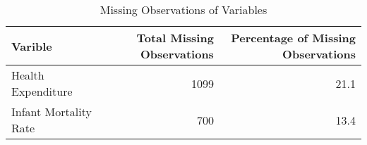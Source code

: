 \setcounter{table}{0}
\begin{table}[H]
\caption{Missing Observations of Variables}
\label{Table 1:missings}
\begin{tabular}{lrr}
\toprule
Varible & Total Missing Observations & Percentage of Missing Observations \\
\midrule
Health Expenditure & 1099 & 21.1 \\
Infant Mortality Rate & 700 & 13.4 \\
\bottomrule
\end{tabular}
\end{table}
